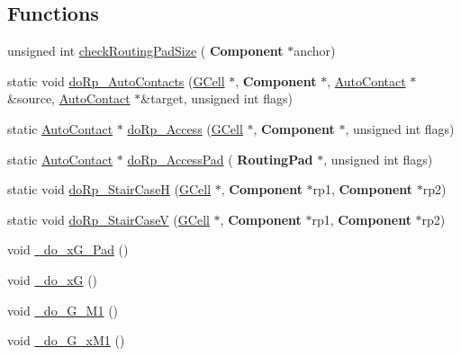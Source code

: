 \subsection*{Functions}
\begin{DoxyCompactItemize}
\item 
unsigned int \hyperlink{group__LoadGlobalRouting_gaad5d32b07d1d53ecc8642e4b10df9605}{check\+Routing\+Pad\+Size} (\textbf{ Component} $\ast$anchor)
\item 
static void \hyperlink{group__LoadGlobalRouting_gae9cae408ea16a3f7c77c3d75f0242f19}{do\+Rp\+\_\+\+Auto\+Contacts} (\hyperlink{classKatabatic_1_1GCell}{G\+Cell} $\ast$, \textbf{ Component} $\ast$, \hyperlink{classKatabatic_1_1AutoContact}{Auto\+Contact} $\ast$\&source, \hyperlink{classKatabatic_1_1AutoContact}{Auto\+Contact} $\ast$\&target, unsigned int flags)
\item 
static \hyperlink{classKatabatic_1_1AutoContact}{Auto\+Contact} $\ast$ \hyperlink{group__LoadGlobalRouting_gada6d3c694b8d741b6504b7c3da166357}{do\+Rp\+\_\+\+Access} (\hyperlink{classKatabatic_1_1GCell}{G\+Cell} $\ast$, \textbf{ Component} $\ast$, unsigned int flags)
\item 
static \hyperlink{classKatabatic_1_1AutoContact}{Auto\+Contact} $\ast$ \hyperlink{group__LoadGlobalRouting_ga60edeea78b56db072fc26a58a7afbcd4}{do\+Rp\+\_\+\+Access\+Pad} (\textbf{ Routing\+Pad} $\ast$, unsigned int flags)
\item 
static void \hyperlink{group__LoadGlobalRouting_ga3291d84592215974fe4052c00304bdb1}{do\+Rp\+\_\+\+Stair\+CaseH} (\hyperlink{classKatabatic_1_1GCell}{G\+Cell} $\ast$, \textbf{ Component} $\ast$rp1, \textbf{ Component} $\ast$rp2)
\item 
static void \hyperlink{group__LoadGlobalRouting_ga6361fb0e90f35cd59063a1ee971ef2a9}{do\+Rp\+\_\+\+Stair\+CaseV} (\hyperlink{classKatabatic_1_1GCell}{G\+Cell} $\ast$, \textbf{ Component} $\ast$rp1, \textbf{ Component} $\ast$rp2)
\item 
void \hyperlink{group__LoadGlobalRouting_gabe00ab10a0dab8a3d2de0709e61e4e7d}{\+\_\+do\+\_\+x\+G\+\_\+Pad} ()
\item 
void \hyperlink{group__LoadGlobalRouting_gaaa6d4ccd2eadfb6bc3e2cc98cfaf2cca}{\+\_\+do\+\_\+xG} ()
\item 
void \hyperlink{group__LoadGlobalRouting_gad24a03e87e269f16dcc28d8c2d9f1cfb}{\+\_\+do\+\_\+G\+\_\+M1} ()
\item 
void \hyperlink{group__LoadGlobalRouting_ga97942453a1bc5b01106aa380271fd7fc}{\+\_\+do\+\_\+G\+\_\+x\+M1} ()

\end{DoxyCompactItemize}
